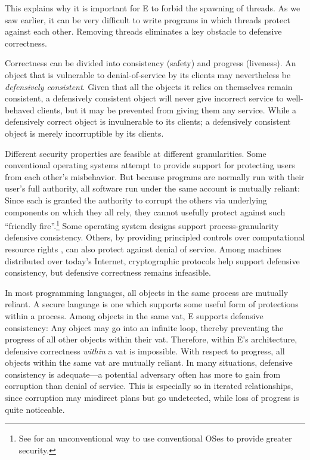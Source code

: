 \documentclass{llncs}
\begin{document}
This explains why it is important for E to forbid the spawning of
threads.  As we saw earlier, it can be very difficult to write
programs in which threads protect against each other.  Removing
threads eliminates a key obstacle to defensive correctness.


Correctness can be divided into consistency (safety) and progress
(liveness). An object that is vulnerable to denial-of-service by its
clients may nevertheless be \emph{defensively consistent}. Given that
all the objects it relies on themselves remain consistent, a
defensively consistent object will never give incorrect service to
well-behaved clients, but it may be prevented from giving them any
service. While a defensively correct object is invulnerable to its
clients; a defensively consistent object is merely incorruptible by
its clients.

Different security properties are feasible at different
granularities. Some conventional operating systems attempt to provide
support for protecting users from each other's misbehavior. But
because programs are normally run with their user's full authority,
all software run under the same account is mutually reliant: Since
each is granted the authority to corrupt the others via underlying
components on which they all rely, they cannot usefully protect
against such ``friendly fire''.\footnote{
%
See \cite{stiegler:polaris} for an unconventional way to use
conventional OSes to provide greater security.}
%
Some operating system designs \cite{dvh} support process-granularity
defensive consistency. Others, by providing principled controls over
computational resource rights \cite{hardy:keykos,shapiro:eros}, can
also protect against denial of service. Among machines distributed
over today's Internet, cryptographic protocols help support defensive
consistency, but defensive correctness remains infeasible.

In most programming languages, all objects in the same process are
mutually reliant. A secure language is one which supports some useful
form of protections within a process.  Among objects in the same vat,
E supports defensive consistency: Any object may go into an infinite
loop, thereby preventing the progress of all other objects within
their vat. Therefore, within E's architecture, defensive correctness
\emph{within} a vat is impossible. With respect to progress, all
objects within the same vat are mutually reliant. In many situations,
defensive consistency is adequate---a potential adversary often has
more to gain from corruption than denial of service. This is
especially so in iterated relationships, since corruption may
misdirect plans but go undetected, while loss of progress is quite
noticeable.
\end{document}
